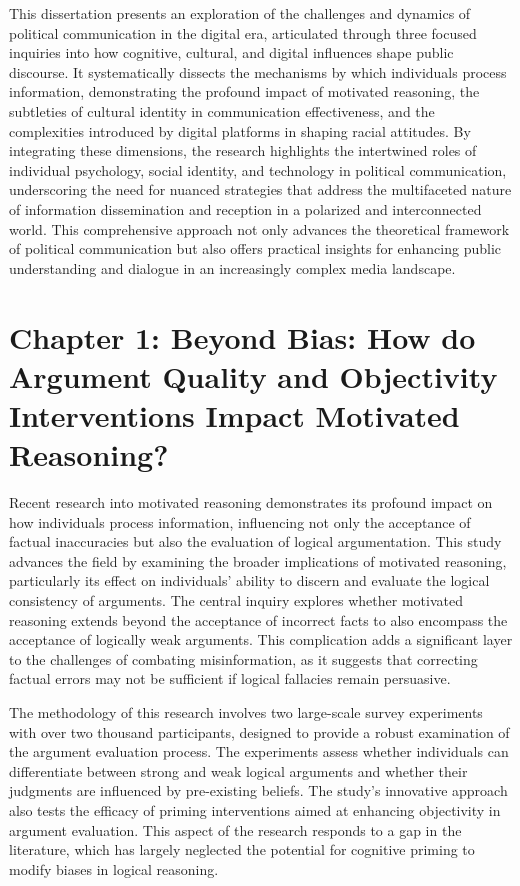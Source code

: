 \documentclass[12pt]{article}[1in]
\begin{document}
This dissertation presents an exploration of the challenges and dynamics of political communication in the digital era, articulated through three focused inquiries into how cognitive, cultural, and digital influences shape public discourse. It systematically dissects the mechanisms by which individuals process information, demonstrating the profound impact of motivated reasoning, the subtleties of cultural identity in communication effectiveness, and the complexities introduced by digital platforms in shaping racial attitudes. By integrating these dimensions, the research highlights the intertwined roles of individual psychology, social identity, and technology in political communication, underscoring the need for nuanced strategies that address the multifaceted nature of information dissemination and reception in a polarized and interconnected world. This comprehensive approach not only advances the theoretical framework of political communication but also offers practical insights for enhancing public understanding and dialogue in an increasingly complex media landscape.

\section*{Chapter 1: Beyond Bias: How do Argument Quality and Objectivity Interventions Impact Motivated Reasoning?} 


Recent research into motivated reasoning demonstrates its profound impact on how individuals process information, influencing not only the acceptance of factual inaccuracies but also the evaluation of logical argumentation. This study advances the field by examining the broader implications of motivated reasoning, particularly its effect on individuals' ability to discern and evaluate the logical consistency of arguments. The central inquiry explores whether motivated reasoning extends beyond the acceptance of incorrect facts to also encompass the acceptance of logically weak arguments. This complication adds a significant layer to the challenges of combating misinformation, as it suggests that correcting factual errors may not be sufficient if logical fallacies remain persuasive.

The methodology of this research involves two large-scale survey experiments with over two thousand participants, designed to provide a robust examination of the argument evaluation process. The experiments assess whether individuals can differentiate between strong and weak logical arguments and whether their judgments are influenced by pre-existing beliefs. The study's innovative approach also tests the efficacy of priming interventions aimed at enhancing objectivity in argument evaluation. This aspect of the research responds to a gap in the literature, which has largely neglected the potential for cognitive priming to modify biases in logical reasoning.
\end{document}
